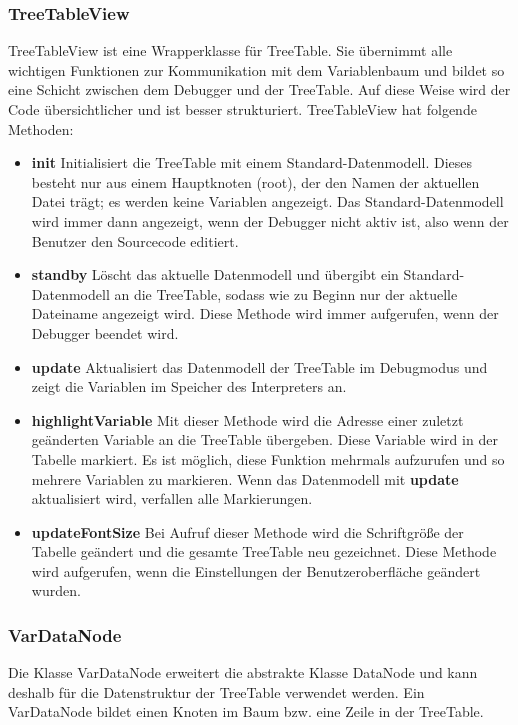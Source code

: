 \subsubsection*{TreeTableView}
TreeTableView ist eine Wrapperklasse für TreeTable. Sie übernimmt alle wichtigen Funktionen zur Kommunikation mit dem Variablenbaum und bildet so eine Schicht zwischen dem Debugger und der TreeTable. Auf diese Weise wird der Code übersichtlicher und ist besser strukturiert.
TreeTableView hat folgende Methoden:
\begin{itemize}
\item \textbf{init} Initialisiert die TreeTable mit einem Standard-Datenmodell. Dieses besteht nur aus einem Hauptknoten (root), der den Namen der aktuellen Datei trägt; es werden keine Variablen angezeigt. Das Standard-Datenmodell wird immer dann angezeigt, wenn der Debugger nicht aktiv ist, also wenn der Benutzer den Sourcecode editiert.
\item \textbf{standby} Löscht das aktuelle Datenmodell und übergibt ein Standard-Datenmodell an die TreeTable, sodass wie zu Beginn nur der aktuelle Dateiname angezeigt wird. Diese Methode wird immer aufgerufen, wenn der Debugger beendet wird.
\item \textbf{update} Aktualisiert das Datenmodell der TreeTable im Debugmodus und zeigt die Variablen im Speicher des Interpreters an.
\item \textbf{highlightVariable} Mit dieser Methode wird die Adresse einer zuletzt geänderten Variable an die TreeTable übergeben. Diese Variable wird in der Tabelle markiert. Es ist möglich, diese Funktion mehrmals aufzurufen und so mehrere Variablen zu markieren. Wenn das Datenmodell mit \textbf{update} aktualisiert wird, verfallen alle Markierungen.
\item \textbf{updateFontSize} Bei Aufruf dieser Methode wird die Schriftgröße der Tabelle geändert und die gesamte TreeTable neu gezeichnet. Diese Methode wird aufgerufen, wenn die Einstellungen der Benutzeroberfläche geändert wurden.
\end{itemize}

\subsubsection*{VarDataNode}
Die Klasse VarDataNode erweitert die abstrakte Klasse DataNode und kann deshalb für die Datenstruktur der TreeTable verwendet werden. Ein VarDataNode bildet einen Knoten im Baum bzw. eine Zeile in der TreeTable.

